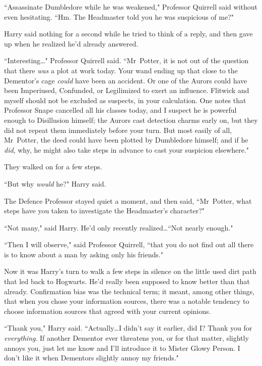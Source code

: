 ``Assassinate Dumbledore while he was weakened," Professor Quirrell said without even hesitating. ``Hm. The Headmaster told you he was suspicious of me?"

Harry said nothing for a second while he tried to think of a reply, and then gave up when he realized he'd already answered.

``Interesting…" Professor Quirrell said. ``Mr~Potter, it is not out of the question that there \emph{was} a plot at work today. Your wand ending up that close to the Dementor's cage \emph{could} have been an accident. Or one of the Aurors could have been Imperiused, Confunded, or Legilimized to exert an influence. Flitwick and myself should not be excluded as suspects, in your calculation. One notes that Professor Snape cancelled all his classes today, and I suspect he is powerful enough to Disillusion himself; the Aurors cast detection charms early on, but they did not repeat them immediately before your turn. But most easily of all, Mr~Potter, the deed could have been plotted by Dumbledore himself; and if he \emph{did}, why, he might also take steps in advance to cast your suspicion elsewhere."

They walked on for a few steps.

``But why \emph{would} he?" Harry said.

The Defence Professor stayed quiet a moment, and then said, ``Mr~Potter, what steps have you taken to investigate the Headmaster's character?"

``Not many," said Harry. He'd only recently realized…``Not nearly enough."

``Then I will observe," said Professor Quirrell, ``that you do not find out all there is to know about a man by asking only his friends."

Now it was Harry's turn to walk a few steps in silence on the little used dirt path that led back to Hogwarts. He'd really been supposed to know better than that already. Confirmation bias was the technical term; it meant, among other things, that when you chose your information sources, there was a notable tendency to choose information sources that agreed with your current opinions.

``Thank you," Harry said. ``Actually…I didn't say it earlier, did I? Thank you for \emph{everything}. If another Dementor ever threatens you, or for that matter, slightly annoys you, just let me know and I'll introduce it to Mister Glowy Person. I don't like it when Dementors slightly annoy my friends."

